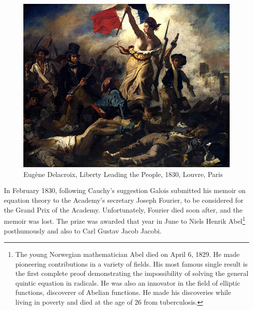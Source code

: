 \documentclass{article}
\begin{document}
\begin{figure}[htbp]
 \centering
 \includegraphics[scale=0.4]{img/lltp.jpg}
 \captionsetup{labelformat=empty}
 \caption{Eugène Delacroix, Liberty Leading the People, 1830, Louvre, Paris}
 \label{fig:Liberty-Leading-the-People}
\end{figure}

In February 1830, following Cauchy's suggestion Galois submitted his memoir on equation theory to the Academy's secretary Joseph Fourier, to be considered for the Grand Prix of the Academy. Unfortunately, Fourier died soon after, and the memoir was lost. The prize was awarded that year in June to Niels Henrik Abel\footnote{The young Norwegian mathematician Abel died on April 6, 1829. He made pioneering contributions in a variety of fields. His most famous single result is the first complete proof demonstrating the impossibility of solving the general quintic equation in radicals. He was also an innovator in the field of elliptic functions, discoverer of Abelian functions. He made his discoveries while living in poverty and died at the age of 26 from tuberculosis.} posthumously and also to Carl Gustav Jacob Jacobi\cite{HanXueTao2009}.
\end{document}
